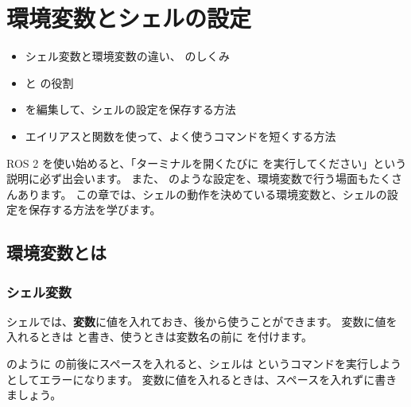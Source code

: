 \chapter{環境変数とシェルの設定}
\label{chap:env}

\begin{goalbox}
  \begin{itemize}
    \item シェル変数と環境変数の違い、 のしくみ
    \item {} と  の役割
    \item {} を編集して、シェルの設定を保存する方法
    \item エイリアスと関数を使って、よく使うコマンドを短くする方法
  \end{itemize}
\end{goalbox}

ROS 2 を使い始めると、「ターミナルを開くたびに  を実行してください」という説明に必ず出会います。
また、 のような設定を、環境変数で行う場面もたくさんあります。
この章では、シェルの動作を決めている環境変数と、シェルの設定を保存する方法を学びます。

\section{環境変数とは}
\label{sec:env-variable}

\subsection{シェル変数}

シェルでは、\textbf{変数}に値を入れておき、後から使うことができます。
変数に値を入れるときは  と書き、使うときは変数名の前に \cmd{\$} を付けます。


\begin{caution}[\cmd{=} の前後にスペースを入れない]
   のように \cmd{=} の前後にスペースを入れると、シェルは  というコマンドを実行しようとしてエラーになります。
  変数に値を入れるときは、スペースを入れずに書きましょう。
\end{caution}

